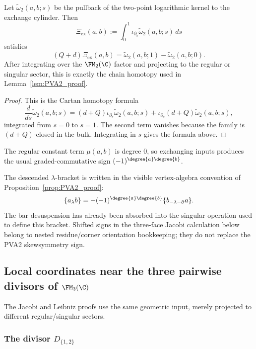 \begin{proposition}
\label{prop:cylinder-homotopy-formula}
Let $\widetilde\omega_2(a,b;s)$ be the pullback of the two-point logarithmic kernel to
the exchange cylinder. Then
\[
\Xi_{\mathrm{ex}}(a,b):=\int_0^1 \iota_{\partial_s}\widetilde\omega_2(a,b;s)\,ds
\]
satisfies
\[
(Q+d)\Xi_{\mathrm{ex}}(a,b)
=
\widetilde\omega_2(a,b;1)-\widetilde\omega_2(a,b;0).
\]
After integrating over the $\FM_2(\C)$ factor and projecting to the regular or singular
sector, this is exactly the chain homotopy used in
Lemma~\ref{lem:PVA2_proof}.
\end{proposition}

\begin{proof}
This is the Cartan homotopy formula
\[
\frac{d}{ds}\widetilde\omega_2(a,b;s)
=
(d+Q)\iota_{\partial_s}\widetilde\omega_2(a,b;s)
+
\iota_{\partial_s}(d+Q)\widetilde\omega_2(a,b;s),
\]
integrated from $s=0$ to $s=1$. The second term vanishes because the family is
$(d+Q)$-closed in the bulk. Integrating in $s$ gives the formula above.
\end{proof}

\begin{remark}
The regular constant term $\mu(a,b)$ is degree $0$, so exchanging inputs
produces the usual graded-commutative sign
$(-1)^{\degree{a}\degree{b}}$.

The descended $\lambda$-bracket is written in the visible
vertex-algebra convention of Proposition~\ref{prop:PVA2_proof}:
\[
\{a_\lambda b\}
=-(-1)^{\degree{a}\degree{b}}\{b_{-\lambda-\partial}a\}.
\]
The bar desuspension has already been absorbed into the singular
operation used to define this bracket.  Shifted signs in the three-face
Jacobi calculation below belong to nested residue/corner orientation
bookkeeping; they do not replace the PVA2 skewsymmetry sign.
\end{remark}

\subsection{Local coordinates near the three pairwise divisors of $\FM_3(\C)$}

The Jacobi and Leibniz proofs use the same geometric input, merely projected
to different regular/singular sectors.

\subsubsection*{The divisor $D_{\{1,2\}}$}

